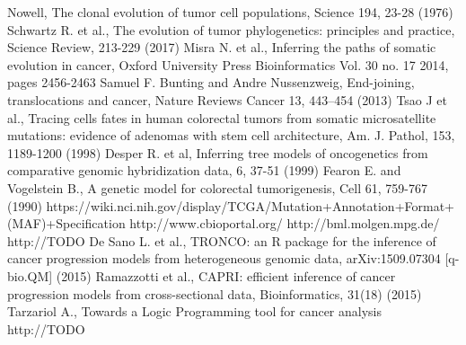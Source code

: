 \documentclass[a4paper]{article}
\begin{document}

	\begin{thebibliography}{20}

	   Nowell, The clonal evolution of tumor cell populations, Science 194, 23-28 (1976)
	   Schwartz R. et al., The evolution of tumor phylogenetics: principles and practice, Science Review, 213-229 (2017)
	   Misra N. et al., Inferring the paths of somatic evolution in cancer, Oxford University Press Bioinformatics Vol. 30 no. 17 2014, pages 2456-2463
           Samuel F. Bunting and Andre Nussenzweig, End-joining, translocations and cancer, Nature Reviews Cancer 13, 443–454 (2013)
		Tsao J et al., Tracing cells fates in human colorectal tumors from somatic microsatellite mutations: evidence of adenomas with stem cell architecture,
		Am. J. Pathol, 153, 1189-1200 (1998)
		Desper R. et al, Inferring tree models of oncogenetics from comparative genomic hybridization data, 6, 37-51 (1999)
		Fearon E. and Vogelstein B., A genetic model for colorectal tumorigenesis, Cell 61, 759-767 (1990)
		https://wiki.nci.nih.gov/display/TCGA/Mutation+Annotation+Format+(MAF)+Specification
		http://www.cbioportal.org/
		http://bml.molgen.mpg.de/
		http://TODO
		De Sano L. et al., TRONCO: an R package for the inference of cancer progression models from heterogeneous genomic data, arXiv:1509.07304  [q-bio.QM] (2015)
		Ramazzotti et al., CAPRI: efficient inference of cancer progression models from cross-sectional data, Bioinformatics, 31(18) (2015)
		Tarzariol A., Towards a Logic Programming tool for cancer analysis
		http://TODO
		
        \end{thebibliography}
\end{document}
